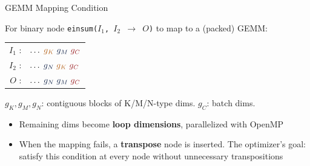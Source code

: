 \documentclass[aspectratio=169,10pt]{beamer}
\newcommand{\ein}[1]{{\small\texttt{#1}}}
\begin{document}
\begin{frame}{GEMM Mapping Condition}

For binary node \ein{einsum($I_1$, $I_2$ $\to$ $O$)} to map to a (packed) GEMM:

\bigskip
\begin{block}{}
\centering
\begin{tabular}{rl}
$I_1$ : & $\ldots\;\textcolor{Gold}{g_K}\;\textcolor{Navy}{g_M}\;\textcolor{Crimson}{g_C}$ \\[4pt]
$I_2$ : & $\ldots\;\textcolor{Navy}{g_N}\;\textcolor{Gold}{g_K}\;\textcolor{Crimson}{g_C}$ \\[4pt]
$O$   : & $\ldots\;\textcolor{Navy}{g_N}\;\textcolor{Navy}{g_M}\;\textcolor{Crimson}{g_C}$ \\
\end{tabular}
\end{block}

\medskip
{\small $g_K, g_M, g_N$: contiguous blocks of K/M/N-type dims. $g_C$: batch dims.}

\bigskip
\begin{itemize}
  \item Remaining dims become \textbf{loop dimensions}, parallelized with OpenMP
  \item When the mapping fails, a \textbf{transpose} node is inserted.
        The optimizer's goal: satisfy this condition at every node without unnecessary transpositions
\end{itemize}
\end{frame}
\end{document}
